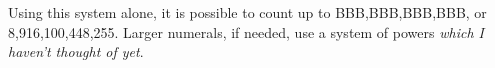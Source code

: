 \documentclass[grammar]{subfiles}
\begin{document}
	Using this system alone, it is possible to count up to BBB,BBB,BBB,BBB\duo, or 8,916,100,448,255\dec. Larger numerals, if needed, use a system of powers \emph{which I haven't thought of yet}.

%	
%
\end{document}
